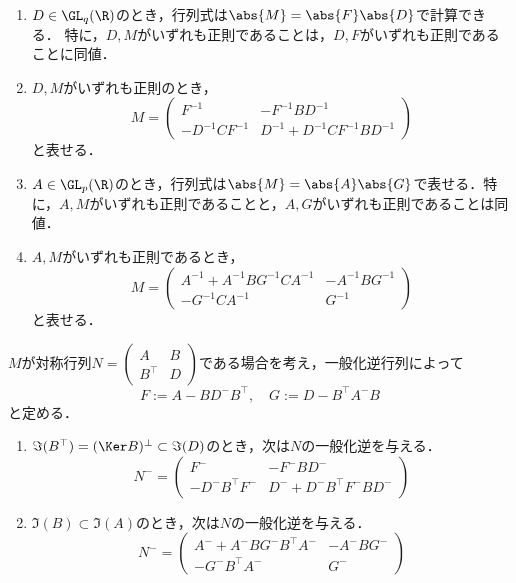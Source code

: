 \documentclass[uplatex, dvipdfmx]{jsreport}
\begin{document}
\begin{theorem}[ブロック行列の逆行列の表現]\mbox{}
    \begin{enumerate}
        \item $D\in\GL_q(\R)$のとき，行列式は$\abs{M}=\abs{F}\abs{D}$で計算できる．
        特に，$D,M$がいずれも正則であることは，$D,F$がいずれも正則であることに同値．
        \item $D,M$がいずれも正則のとき，
        \[M=\begin{pmatrix}F^{-1}&-F^{-1}BD^{-1}\\-D^{-1}CF^{-1}&D^{-1}+D^{-1}CF^{-1}BD^{-1}\end{pmatrix}\]
        と表せる．
        \item $A\in\GL_p(\R)$のとき，行列式は$\abs{M}=\abs{A}\abs{G}$で表せる．特に，$A,M$がいずれも正則であることと，$A,G$がいずれも正則であることは同値．
        \item $A,M$がいずれも正則であるとき，
        \[M=\begin{pmatrix}A^{-1}+A^{-1}BG^{-1}CA^{-1}&-A^{-1}BG^{-1}\\-G^{-1}CA^{-1}&G^{-1}\end{pmatrix}\]
        と表せる．
    \end{enumerate}
\end{theorem}

\begin{proposition}
    $M$が対称行列$N=\begin{pmatrix}A&B\\B^\top&D\end{pmatrix}$である場合を考え，一般化逆行列によって
    \[F:=A-BD^-B^\top,\quad G:=D-B^\top A^-B\]
    と定める．
    \begin{enumerate}
        \item $\Im(B^\top)=(\Ker B)^\perp\subset\Im(D)$のとき，次は$N$の一般化逆を与える．
        \[N^-=\begin{pmatrix}F^-&-F^-BD^-\\-D^-B^\top F^-&D^-+D^-B^\top F^-BD^-\end{pmatrix}\]
        \item $\Im(B)\subset\Im(A)$のとき，次は$N$の一般化逆を与える．
        \[N^-=\begin{pmatrix}A^-+A^-BG^-B^\top A^-&-A^-BG^-\\-G^-B^\top A^-&G^-\end{pmatrix}\]
    \end{enumerate}
\end{proposition}
\end{document}
